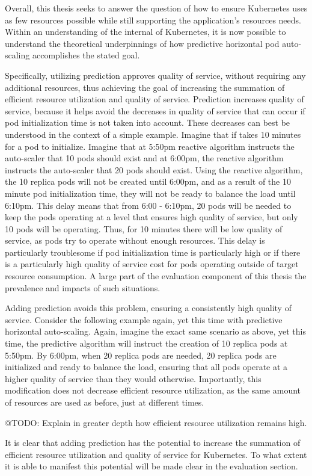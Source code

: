 Overall, this thesis seeks to answer the question of how to ensure Kubernetes
uses as few resources possible while still supporting the application's
resources needs. Within an understanding of the internal of Kubernetes, it is now
possible to understand the theoretical underpinnings of how predictive
horizontal pod auto-scaling accomplishes the stated goal.

Specifically, utilizing prediction approves quality of service, without
requiring any additional resources, thus achieving the goal of increasing the
summation of efficient resource utilization and quality of service. Prediction
increases quality of service, because it helps avoid the decreases in quality of
service that can occur if pod initialization time is not taken into account.
These decreases can best be understood in the context of a simple example.
Imagine that if takes 10 minutes for a pod to initialize. Imagine that at 5:50pm
reactive algorithm instructs the auto-scaler that 10 pods should exist and at
6:00pm, the reactive algorithm instructs the auto-scaler that 20 pods should
exist. Using the reactive algorithm, the 10 replica pods will not be created
until 6:00pm, and as a result of the 10 minute pod initialization time, they
will not be ready to balance the load until 6:10pm. This delay means that from
6:00 - 6:10pm, 20 pods will be needed to keep the pods operating at a level that
ensures high quality of service, but only 10 pods will be operating. Thus, for
10 minutes there will be low quality of service, as pods try to operate without
enough resources. This delay is particularly troublesome if pod initialization
time is particularly high or if there is a particularly high quality of service
cost for pods operating outside of target resource consumption. A large part of
the evaluation component of this thesis the prevalence and impacts of such
situations.

Adding prediction avoids this problem, ensuring a consistently high quality of
service. Consider the following example again, yet this time with predictive
horizontal auto-scaling. Again, imagine the exact same scenario as above, yet
this time, the predictive algorithm will instruct the creation of 10 replica
pods at 5:50pm. By 6:00pm, when 20 replica pods are needed, 20 replica pods are
initialized and ready to balance the load, ensuring that all pods operate at a
higher quality of service than they would otherwise. Importantly, this
modification does not decrease efficient resource utilization, as the same
amount of resources are used as before, just at different times.

@TODO: Explain in greater depth how efficient resource utilization remains high.

It is clear that adding prediction has the potential to increase the summation
of efficient resource utilization and quality of service for Kubernetes. To what
extent it is able to manifest this potential will be made clear in the
evaluation section.
